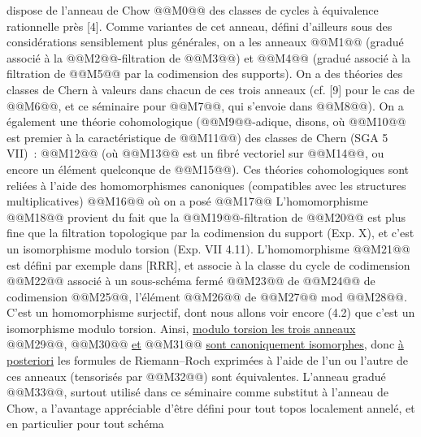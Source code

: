 
dispose de l'anneau de Chow @@M0@@ des classes de cycles à équivalence rationnelle près [4]. Comme variantes de cet anneau, défini d'ailleurs sous des considérations sensiblement plus générales, on a les anneaux @@M1@@ (gradué associé à la @@M2@@-filtration de @@M3@@) et @@M4@@ (gradué associé à la filtration de @@M5@@ par la codimension des supports). On a des théories des classes de Chern à valeurs dans chacun de ces trois anneaux (cf. [9] pour le cas de @@M6@@, et ce séminaire pour @@M7@@, qui s'envoie dans @@M8@@). On a également une théorie cohomologique (@@M9@@-adique, disons, où @@M10@@ est premier à la caractéristique de @@M11@@) des classes de Chern (SGA 5 VII)~:
@@M12@@
(où @@M13@@ est un fibré vectoriel sur @@M14@@, ou encore un élément quelconque de @@M15@@). Ces théories cohomologiques sont reliées à l'aide des homomorphismes canoniques (compatibles avec les structures multiplicatives)
@@M16@@
où on a posé
@@M17@@
L'homomorphisme @@M18@@ provient du fait que la @@M19@@-filtration de @@M20@@ est plus fine que la filtration topologique par la codimension du support (Exp. X), et c'est un isomorphisme modulo torsion (Exp. VII 4.11). L'homomorphisme @@M21@@ est défini par exemple dans [RRR], et associe à la classe du cycle de codimension @@M22@@ associé à un sous-schéma fermé @@M23@@ de @@M24@@ de codimension @@M25@@, l'élément @@M26@@ de @@M27@@ mod @@M28@@. C'est un homomorphisme surjectif, dont nous allons voir encore (4.2) que c'est un isomorphisme modulo torsion. Ainsi, \uline{modulo torsion les trois anneaux} @@M29@@, @@M30@@ \uline{et} @@M31@@ \uline{sont canoniquement isomorphes}, donc \uline{à posteriori} les formules de Riemann--Roch exprimées à l'aide de l'un ou l'autre de ces anneaux (tensorisés par @@M32@@) sont équivalentes. L'anneau gradué @@M33@@, surtout utilisé dans ce séminaire comme substitut à l'anneau de Chow, a l'avantage appréciable d'être défini pour tout topos localement annelé, et en particulier pour tout schéma 
